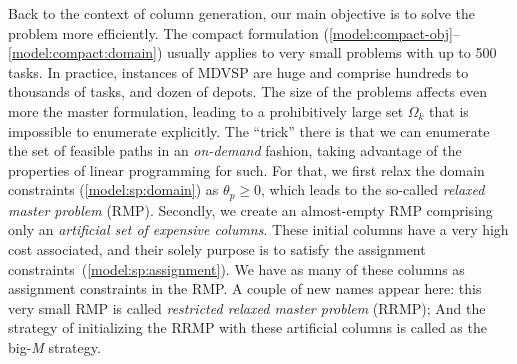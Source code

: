 \documentclass{article}
\begin{document}
Back to the context of column generation, our main objective is to solve the problem more efficiently. The compact formulation (\ref{model:compact-obj}--\ref{model:compact:domain}) usually applies to very small problems with up to 500 tasks. In practice, instances of MDVSP are huge and comprise hundreds to thousands of tasks, and dozen of depots. The size of the problems affects even more the master formulation, leading to a prohibitively large set $\Omega_k$ that is impossible to enumerate explicitly. The ``trick'' there is that we can enumerate the set of feasible paths in an \textit{on-demand} fashion, taking advantage of the properties of linear programming for such. For that, we first relax the domain constraints (\ref{model:sp:domain}) as $\theta_p \geqslant 0$, which leads to the so-called \textit{relaxed master problem} (RMP). Secondly, we create an almost-empty RMP comprising only an \textit{artificial set of expensive columns}. These initial columns have a very high cost associated, and their solely purpose is to satisfy the assignment constraints~(\ref{model:sp:assignment}). We have as many of these columns as assignment constraints in the RMP. A couple of new names appear here: this very small RMP is called \textit{restricted relaxed master problem} (RRMP); And the strategy of initializing the RRMP with these artificial columns is called as the big-\textit{M} strategy.
\end{document}
